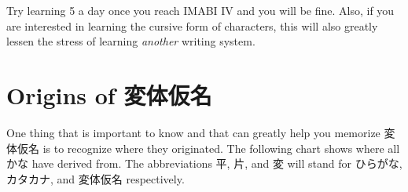\par{Try learning 5 a day once you reach IMABI IV and you will be fine. Also, if you are interested in learning the cursive form of characters, this will also greatly lessen the stress of learning \emph{another }writing system. \hfill\break
}
      
\section{Origins of 変体仮名}
 
\par{One thing that is important to know and that can greatly help you memorize 変体仮名 is to recognize where they originated. The following chart shows where all かな have derived from. The abbreviations 平, 片, and 変 will stand for ひらがな, カタカナ, and 変体仮名 respectively. }
 
